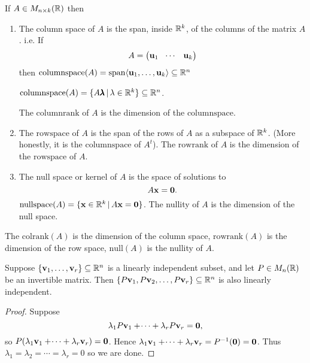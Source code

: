 \documentclass[10pt, a4paper]{article}
\begin{document}
\begin{definition}
    If $A \in M_{n \times k}(\mathbb{R})$ then
    \begin{enumerate}[label = (\roman*)]
        \item The column space of $A$ is the span,
        inside $\mathbb{R} ^ k$,
        of the columns of the matrix $A$.
        i.e.
        If
        \[
        A = \begin{pmatrix}
            \mathbf{u}_1 & \dotsi & \mathbf{u}_k
        \end{pmatrix}
        \]
        then $\mathrm{columnspace}(A) = \mathrm{span}\langle\mathbf{u}_1, \dotsc, \mathbf{u}_k\rangle \subseteq \mathbb{R} ^ n$
        
        $\mathrm{columnspace}(A) = \{A\pmb{\lambda}\,|\,\lambda \in \mathbb{R} ^ k\} \subseteq \mathbb{R} ^ n$.

        The $\mathrm{columnrank}$ of $A$ is the dimension of the $\mathrm{columnspace}$.

        \item The $\mathrm{rowspace}$ of $A$ is the span of the rows of $A$ as a subspace of $\mathbb{R} ^ k$.
        (More honestly,
        it is the $\mathrm{columnspace}$ of $A ^ t$).
        The $\mathrm{rowrank}$ of $A$ is the dimension of the $\mathrm{rowspace}$ of $A$.
        \item The null space or kernel of $A$ is the space of solutions to
        \[
        A\mathbf{x} = \mathbf{0}.
        \]
        $\mathrm{nullspace}(A) = \{\mathbf{x} \in \mathbb{R} ^ k\,|\, A\mathbf{x} = \mathbf{0}\}$.
        The nullity of $A$ is the dimension of the null space.
    \end{enumerate}
\end{definition}

The $\mathrm{colrank}(A)$ is the dimension of the column space,
$\mathrm{rowrank}(A)$ is the dimension of the row space,
$\mathrm{null}(A)$ is the nullity of $A$.

\begin{lemma}
    Suppose $\{\mathbf{v}_1, \dotsc, \mathbf{v}_r\} \subseteq \mathbb{R} ^ n$ is a linearly independent subset,
    and let $P \in M_{n}(\mathbb{R})$ be an invertible matrix.
    Then $\{P\mathbf{v}_1, P\mathbf{v}_2, \dotsc, P\mathbf{v}_r\} \subseteq \mathbb{R} ^ n$ is also linearly independent.
    \begin{proof}
        Suppose
        \[
        \lambda_1P\mathbf{v}_1 + \dotsi + \lambda_rP\mathbf{v}_r = \mathbf{0},
        \]
        so $P(\lambda_1\mathbf{v}_1 + \dotsi + \lambda_r\mathbf{v}_r) = \mathbf{0}$.
        Hence $\lambda_1\mathbf{v}_1 + \dotsi + \lambda_r\mathbf{v}_r = P ^ {-1}(\mathbf{0}) = \mathbf{0}$.
        Thus $\lambda_1 = \lambda_2 = \dotsi = \lambda_r = 0$ so we are done.
    \end{proof}
\end{lemma}
\end{document}
